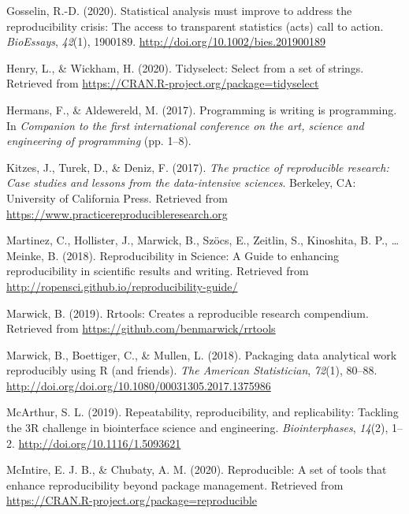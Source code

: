 \documentclass[12pt,twoside]{reedthesis}
\begin{document}
\hypertarget{ref-bioessays-gosselin}{}
Gosselin, R.-D. (2020). Statistical analysis must improve to address the
reproducibility crisis: The access to transparent statistics (acts) call
to action. \emph{BioEssays}, \emph{42}(1), 1900189.
\url{http://doi.org/10.1002/bies.201900189}

\hypertarget{ref-R-tidyselect}{}
Henry, L., \& Wickham, H. (2020). Tidyselect: Select from a set of
strings. Retrieved from
\url{https://CRAN.R-project.org/package=tidyselect}

\hypertarget{ref-hermans2017programming}{}
Hermans, F., \& Aldewereld, M. (2017). Programming is writing is
programming. In \emph{Companion to the first international conference on
the art, science and engineering of programming} (pp. 1--8).

\hypertarget{ref-kitzes2017practice}{}
Kitzes, J., Turek, D., \& Deniz, F. (2017). \emph{The practice of
reproducible research: Case studies and lessons from the data-intensive
sciences}. Berkeley, CA: University of California Press. Retrieved from
\url{https://www.practicereproducibleresearch.org}

\hypertarget{ref-r-opensci}{}
Martinez, C., Hollister, J., Marwick, B., Szöcs, E., Zeitlin, S.,
Kinoshita, B. P., \ldots{} Meinke, B. (2018). Reproducibility in
Science: A Guide to enhancing reproducibility in scientific results and
writing. Retrieved from
\url{http://ropensci.github.io/reproducibility-guide/}

\hypertarget{ref-R-rrtools}{}
Marwick, B. (2019). Rrtools: Creates a reproducible research compendium.
Retrieved from \url{https://github.com/benmarwick/rrtools}

\hypertarget{ref-marwick2018packaging}{}
Marwick, B., Boettiger, C., \& Mullen, L. (2018). Packaging data
analytical work reproducibly using R (and friends). \emph{The American
Statistician}, \emph{72}(1), 80--88.
\url{http://doi.org/doi.org/10.1080/00031305.2017.1375986}

\hypertarget{ref-engineering-reproducibility}{}
McArthur, S. L. (2019). Repeatability, reproducibility, and
replicability: Tackling the 3R challenge in biointerface science and
engineering. \emph{Biointerphases}, \emph{14}(2), 1--2.
\url{http://doi.org/10.1116/1.5093621}

\hypertarget{ref-R-reproducible}{}
McIntire, E. J. B., \& Chubaty, A. M. (2020). Reproducible: A set of
tools that enhance reproducibility beyond package management. Retrieved
from \url{https://CRAN.R-project.org/package=reproducible}
\end{document}
